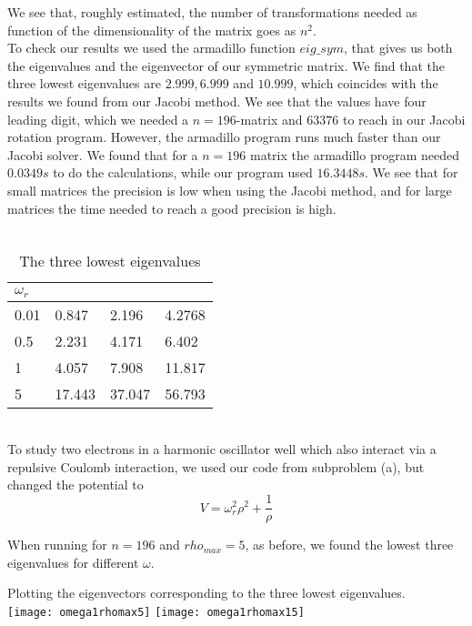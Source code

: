 \documentclass[a4paper,12pt, english]{article}
\begin{document}
We see that, roughly estimated, the number of transformations needed as function of the dimensionality of the matrix goes as $n^2$. \\


To check our results we used the armadillo function $eig\_sym$, that gives us both the eigenvalues and the eigenvector of our symmetric matrix. We find that the three lowest eigenvalues are $2.999, 6.999$ and $10.999$, which coincides with the results we found from our Jacobi method. We see that the values have four leading digit, which we needed a $n=196$-matrix and $63376$ to reach in our Jacobi rotation program. However, the armadillo program runs much faster than our Jacobi solver. We found that for a $n=196$ matrix the armadillo program needed $0.0349 s$ to do the calculations, while our program used $16.3448 s$. We see that for small matrices the precision is low when using the Jacobi method, and for large matrices the time needed to reach a good precision is high. \\

\\

\begin{table} [h!]
\caption{The three lowest eigenvalues}
\centering
\begin{tabular}{l | l l l} 
\hline
$\omega_r$ & & &\\
\hline
0.01 & 0.847 & 2.196 & 4.2768   \\ [0.5ex]
0.5 & 2.231 & 4.171 & 6.402 \\
1 & 4.057 & 7.908 & 11.817\\
5 & 17.443 & 37.047 & 56.793
\end{tabular}
\end{table}

\\

To study two electrons in a harmonic oscillator well which also interact via a repulsive Coulomb interaction, we used our code from subproblem (a), but changed the potential to $$V = \omega_r^2 \rho^2 + \frac{1}{\rho} $$


When running for $n=196$ and $rho_{max} = 5$, as before, we found the lowest three eigenvalues for different $\omega.$


Plotting the eigenvectors corresponding to the three lowest eigenvalues.\\

\texttt{[image: omega1rhomax5]}
\texttt{[image: omega1rhomax15]}
\end{document}
